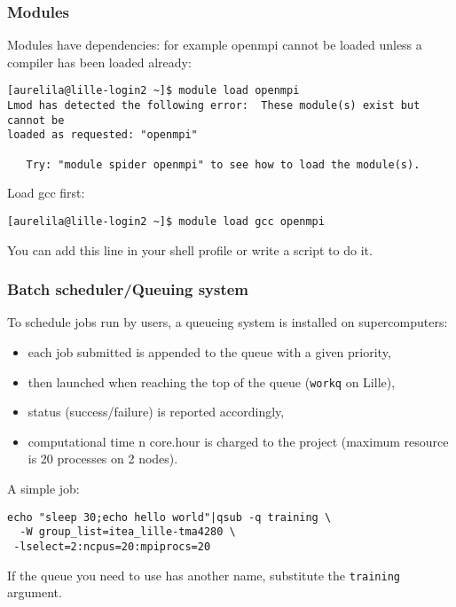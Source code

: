 \begin{frame}[fragile]
  \frametitle{Modules}

Modules have dependencies: for example openmpi cannot be loaded unless a compiler has been loaded already:
{\tiny
\begin{lstlisting}[style=shell]
[aurelila@lille-login2 ~]$ module load openmpi
Lmod has detected the following error:  These module(s) exist but cannot be
loaded as requested: "openmpi"

   Try: "module spider openmpi" to see how to load the module(s).

\end{lstlisting}
}

Load gcc first:
{\small
\begin{lstlisting}[style=shell]
[aurelila@lille-login2 ~]$ module load gcc openmpi
\end{lstlisting}
}

\medskip
You can add this line in your shell profile or write a script to do it.


\end{frame}

\begin{frame}[fragile]
\frametitle{Batch scheduler/Queuing system}

To schedule jobs run by users, a queueing system is installed on supercomputers:
\begin{itemize}
\item each job submitted is appended to the queue with a given priority,
\item then launched when reaching the top of the queue (\texttt{workq} on Lille),
\item status (success/failure) is reported accordingly,
\item computational time n core.hour is charged to the project (maximum resource is 20 processes on 2 nodes).
\end{itemize}

\bigskip
A simple job:
{\small
\begin{lstlisting}[style=shell]
echo "sleep 30;echo hello world"|qsub -q training \
  -W group_list=itea_lille-tma4280 \
 -lselect=2:ncpus=20:mpiprocs=20
\end{lstlisting}
}
If the queue you need to use has another name, substitute the \texttt{training} argument.
\end{frame}


